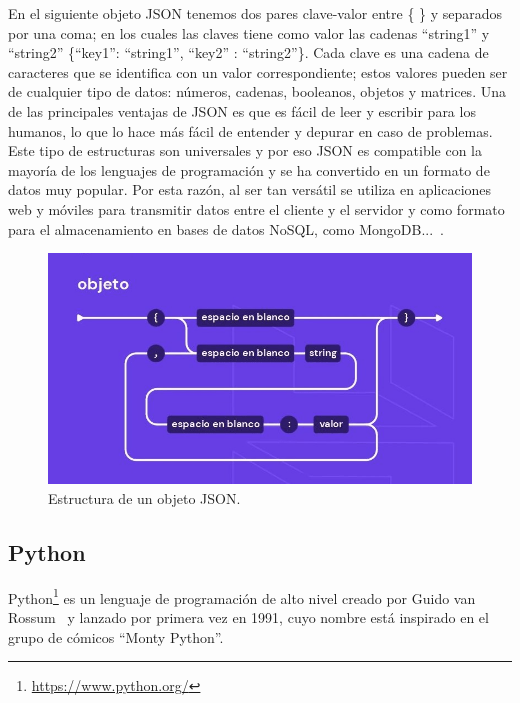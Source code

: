 \documentclass[a4paper, 12pt]{book}
\begin{document}
En el siguiente objeto JSON tenemos dos pares clave-valor entre \{ \} y separados por una coma; en los cuales las claves tiene como valor las cadenas ``string1'' y ``string2'' \{``key1'': ``string1'', ``key2'' : ``string2''\}. 
Cada clave es una cadena de caracteres que se identifica con un valor correspondiente; estos valores pueden ser de cualquier tipo de datos: números, cadenas, booleanos, objetos y matrices.
Una de las principales ventajas de JSON es que es fácil de leer y escribir para los humanos, lo que lo hace más fácil de entender y depurar en caso de problemas. 
Este tipo de estructuras son universales y por eso JSON es compatible con la mayoría de los lenguajes de programación y se ha convertido en un formato de datos muy popular.
Por esta razón, al ser tan versátil se utiliza en aplicaciones web y móviles para transmitir datos entre el cliente y el servidor y como formato para el almacenamiento en bases de datos NoSQL, como MongoDB...~\cite{mora2016serializacion}. 

\begin{figure}
  \centering
  \includegraphics[width=12cm, keepaspectratio]{img/object-json.png}
  \caption{Estructura de un objeto JSON.}\label{fig:json}
\end{figure}

\newpage

\subsection{Python} %
\label{sec:python} %


Python\footnote{\url{https://www.python.org/}} es un lenguaje de programación de alto nivel creado por Guido van Rossum~\cite{challenger2014lenguaje} y lanzado por primera vez en 1991, cuyo nombre está inspirado en el grupo de cómicos “Monty Python”.  
\end{document}
